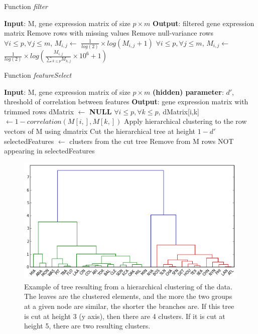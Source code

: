 \documentclass{report}
\begin{document}
{\begin{algorithm}[H]
\caption{Function \emph{filter}}
\begin{algorithmic}
\STATE \textbf{Input}: M, gene expression matrix of size $p \times m$
\STATE \textbf{Output}: filtered gene expression matrix
\STATE Remove rows with missing values
\STATE Remove null-variance rows
\STATE $\forall i \leq p, \forall j \leq m$, $M_{i,j} \leftarrow$ $\frac{1}{log(2)} \times log(M_{i,j}+1)$
\ELSE 
\STATE $\forall i \leq p, \forall j \leq m$, $M_{i,j} \leftarrow$ $\frac{1}{log(2)} \times log(\frac{M_{i,j}}{\sum{_{k \leq p} M_{k,j}}} \times 10^6+1)$
\ENDIF
{}
\end{algorithmic}
\end{algorithm}

\begin{algorithm}[H]
\caption{Function \emph{featureSelect}}
\begin{algorithmic}
\STATE \textbf{Input}: M, gene expression matrix of size $p \times m$
\STATE \textbf{(hidden) parameter}: $d'$, threshold of correlation between features 
\STATE \textbf{Output}: gene expression matrix with trimmed rows
\STATE dMatrix $\leftarrow$ \textbf{NULL}
\STATE $\forall i \leq p, \forall k \leq p$, dMatrix[i,k] $\leftarrow 1-correlation(M[i,], M[k,])$
\STATE Apply hierarchical clustering to the row vectors of M using dmatrix
\STATE Cut the hierarchical tree at height $1-d'$
\STATE selectedFeatures $\leftarrow$ clusters from the cut tree
\STATE Remove from M rows NOT appearing in selectedFeatures
\end{algorithmic}
\end{algorithm}

\begin{figure}[H]
\centering
\includegraphics[scale=0.5]{illustrations/treecut.png}
\caption{Example of tree resulting from a hierarchical clustering of the data\cite{imgTreecut}. The leaves are the clustered elements, and the more the two groups at a given node are similar, the shorter the branches are. If this tree is cut at height 3 (y axis), then there are 4 clusters. If it is cut at height 5, there are two resulting clusters.}
\label{treecut}
\end{figure}

}
\end{document}
